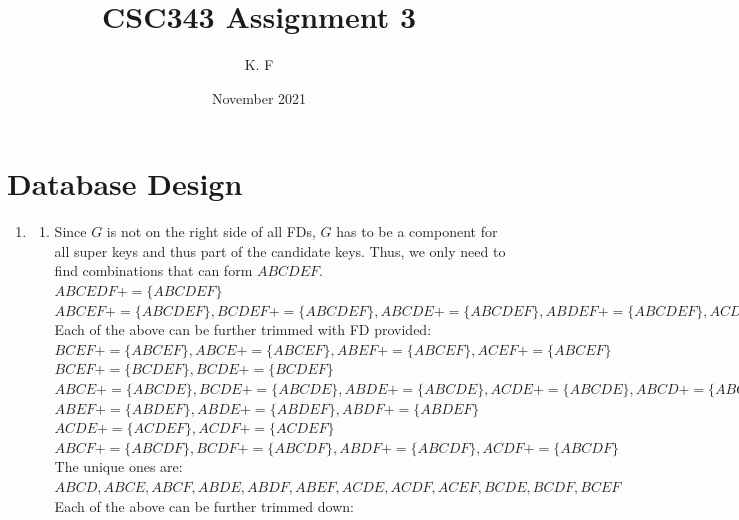 \documentclass{article}
\title{CSC343 Assignment 3}
\author{K. F }
\date{November 2021}
\begin{document}
\maketitle

\section{Database Design}

\begin{enumerate}
    \item 
    
    \begin{enumerate}
        \item 
        
        Since $G$ is not on the right side of all FDs, $G$ has to be a component for all super keys and thus part of the candidate keys. Thus, we only need to find combinations that can form $ABCDEF$. \\
        
        $ABCEDF+ = \{ABCDEF\}$ \\
        
        $ABCEF+ = \{ABCDEF\}, BCDEF+=\{ABCDEF\}, ABCDE+=\{ABCDEF\}, ABDEF+=\{ABCDEF\}, ACDEF+=\{ABCDEF\}, ABCDF+=\{ABCDEF\}$ \\
        
        Each of the above can be further trimmed with FD provided:\\
        
        $BCEF+ = \{ABCEF\}, ABCE+ = \{ABCEF\}, ABEF+ = \{ABCEF\}, ACEF+ = \{ABCEF\}$ \\
        $BCEF+ = \{BCDEF\}, BCDE+ = \{BCDEF\}$\\
        $ABCE+ = \{ABCDE\}, BCDE+ = \{ABCDE\}, ABDE+ = \{ABCDE\}, ACDE+ = \{ABCDE\}, ABCD+ = \{ABCDE\}$\\
        $ABEF+ = \{ABDEF\}, ABDE+ = \{ABDEF\}, ABDF+ = \{ABDEF\}$\\
        $ACDE+ = \{ACDEF\}, ACDF+ = \{ACDEF\}$\\
        $ABCF+ = \{ABCDF\}, BCDF+ = \{ABCDF\}, ABDF+ = \{ABCDF\}, ACDF+ = \{ABCDF\}$ \\
        
        The unique ones are:\\
        $ABCD, ABCE, ABCF, ABDE, ABDF, ABEF, ACDE, ACDF, ACEF, BCDE, BCDF, BCEF$\\
        
        Each of the above can be further trimmed down:\\
        

\end{enumerate}
\end{enumerate}
\end{document}
